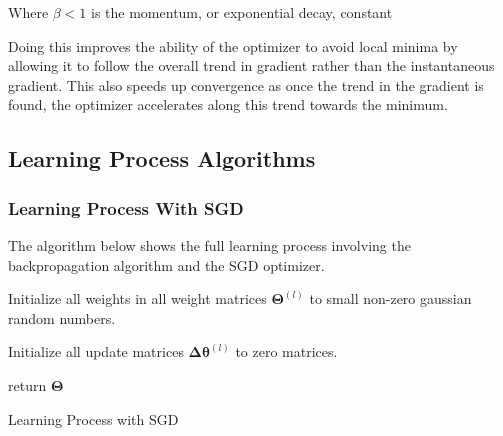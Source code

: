 \documentclass{article}
\begin{document}
\hfill \newline
Where $\beta<1$ is the momentum, or exponential decay, constant 
\hfill \newline

Doing this improves the ability of the optimizer to avoid local minima by allowing it to follow the overall trend in gradient rather than the instantaneous gradient. This also speeds up convergence as once the trend in the gradient is found, the optimizer accelerates along this trend towards the minimum.
\hfill\newpage
\subsection{Learning Process Algorithms}


\subsubsection{Learning Process With SGD}
The algorithm below shows the full learning process involving the backpropagation algorithm and the SGD optimizer.
\begin{algorithm}[h]
	\SetAlgoLined
	
	Initialize all weights in all weight matrices $\boldsymbol\Theta^{(l)}$ to small non-zero gaussian random numbers.
	
	Initialize all update matrices $\boldsymbol{\Delta\theta}^{(l)}$ to zero matrices.
	
return $\boldsymbol\Theta$
\caption{Learning Process with SGD}
\end{algorithm}
\end{document}
